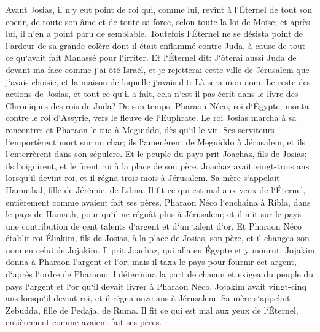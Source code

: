 \verse Avant Josias, il n`y eut point de roi qui, comme lui, revînt à l`Éternel de tout son coeur, de toute son âme et de toute sa force, selon toute la loi de Moïse; et après lui, il n`en a point paru de semblable. 
\verse Toutefois l`Éternel ne se désista point de l`ardeur de sa grande colère dont il était enflammé contre Juda, à cause de tout ce qu`avait fait Manassé pour l`irriter. 
\verse Et l`Éternel dit: J`ôterai aussi Juda de devant ma face comme j`ai ôté Israël, et je rejetterai cette ville de Jérusalem que j`avais choisie, et la maison de laquelle j`avais dit: Là sera mon nom. 
\verse Le reste des actions de Josias, et tout ce qu`il a fait, cela n`est-il pas écrit dans le livre des Chroniques des rois de Juda? 
\verse De son temps, Pharaon Néco, roi d`Égypte, monta contre le roi d`Assyrie, vers le fleuve de l`Euphrate. Le roi Josias marcha à sa rencontre; et Pharaon le tua à Meguiddo, dès qu`il le vit. 
\verse Ses serviteurs l`emportèrent mort sur un char; ils l`amenèrent de Meguiddo à Jérusalem, et ils l`enterrèrent dans son sépulcre. Et le peuple du pays prit Joachaz, fils de Josias; ils l`oignirent, et le firent roi à la place de son père. 
\verse Joachaz avait vingt-trois ans lorsqu`il devint roi, et il régna trois mois à Jérusalem. Sa mère s`appelait Hamuthal, fille de Jérémie, de Libna. 
\verse Il fit ce qui est mal aux yeux de l`Éternel, entièrement comme avaient fait ses pères. 
\verse Pharaon Néco l`enchaîna à Ribla, dans le pays de Hamath, pour qu`il ne régnât plus à Jérusalem; et il mit sur le pays une contribution de cent talents d`argent et d`un talent d`or. 
\verse Et Pharaon Néco établit roi Éliakim, fils de Josias, à la place de Josias, son père, et il changea son nom en celui de Jojakim. Il prit Joachaz, qui alla en Égypte et y mourut. 
\verse Jojakim donna à Pharaon l`argent et l`or; mais il taxa le pays pour fournir cet argent, d`après l`ordre de Pharaon; il détermina la part de chacun et exigea du peuple du pays l`argent et l`or qu`il devait livrer à Pharaon Néco. 
\verse Jojakim avait vingt-cinq ans lorsqu`il devint roi, et il régna onze ans à Jérusalem. Sa mère s`appelait Zebudda, fille de Pedaja, de Ruma. 
\verse Il fit ce qui est mal aux yeux de l`Éternel, entièrement comme avaient fait ses pères. 

\chapter{}

